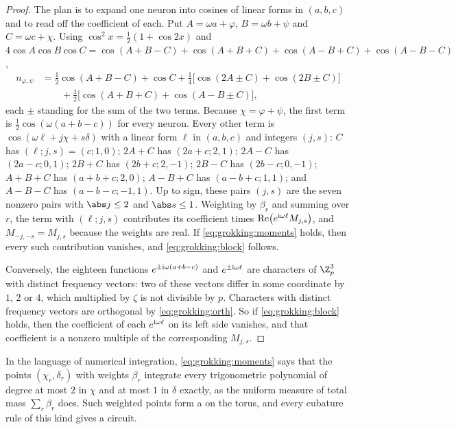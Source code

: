 \begin{refsection}
\begin{proof}
The plan is to expand one neuron into cosines of linear forms in $(a,b,c)$ and to read off the coefficient of each. Put $A=\omega a+\varphi$, $B=\omega b+\psi$ and $C=\omega c+\chi$. Using $\cos^2x=\frac12(1+\cos2x)$ and $4\cos A\cos B\cos C=\cos(A+B-C)+\cos(A+B+C)+\cos(A-B+C)+\cos(A-B-C)$,
\begin{align*}
  n_{\varphi,\psi}&=\tfrac12\cos(A+B-C)+\cos C+\tfrac14\bigl[\cos(2A\pm C)+\cos(2B\pm C)\bigr]\\
  &\qquad+\tfrac12\bigl[\cos(A+B+C)+\cos(A-B\pm C)\bigr],
\end{align*}
each $\pm$ standing for the sum of the two terms. Because $\chi=\varphi+\psi$, the first term is $\frac12\cos(\omega(a+b-c))$ for every neuron. Every other term is $\cos(\omega\ell+j\chi+s\delta)$ with a linear form $\ell$ in $(a,b,c)$ and integers $(j,s)$: $C$ has $(\ell;j,s)=(c;1,0)$; $2A+C$ has $(2a+c;2,1)$; $2A-C$ has $(2a-c;0,1)$; $2B+C$ has $(2b+c;2,-1)$; $2B-C$ has $(2b-c;0,-1)$; $A+B+C$ has $(a+b+c;2,0)$; $A-B+C$ has $(a-b+c;1,1)$; and $A-B-C$ has $(a-b-c;-1,1)$. Up to sign, these pairs $(j,s)$ are the seven nonzero pairs with $\abs j\le2$ and $\abs s\le1$. Weighting by $\beta_r$ and summing over $r$, the term with $(\ell;j,s)$ contributes its coefficient times $\operatorname{Re}\bigl(e^{\mathrm{i}\omega\ell}M_{j,s}\bigr)$, and $M_{-j,-s}=\overline{M_{j,s}}$ because the weights are real. If \eqref{eq:grokking:moments} holds, then every such contribution vanishes, and \eqref{eq:grokking:block} follows.

Conversely, the eighteen functions $e^{\pm\mathrm{i}\omega(a+b-c)}$ and $e^{\pm\mathrm{i}\omega\ell}$ are characters of $\grokZp^3$ with distinct frequency vectors: two of these vectors differ in some coordinate by $1$, $2$ or $4$, which multiplied by $\zeta$ is not divisible by $p$. Characters with distinct frequency vectors are orthogonal by \eqref{eq:grokking:orth}. So if \eqref{eq:grokking:block} holds, then the coefficient of each $e^{\mathrm{i}\omega\ell}$ on its left side vanishes, and that coefficient is a nonzero multiple of the corresponding $M_{j,s}$.
\end{proof}

In the language of numerical integration, \eqref{eq:grokking:moments} says that the points $(\chi_r,\delta_r)$ with weights $\beta_r$ integrate every trigonometric polynomial of degree at most $2$ in $\chi$ and at most $1$ in $\delta$ exactly, as the uniform measure of total mass $\sum_r\beta_r$ does. Such weighted points form a  on the torus, and every cubature rule of this kind gives a circuit.


\end{refsection}
